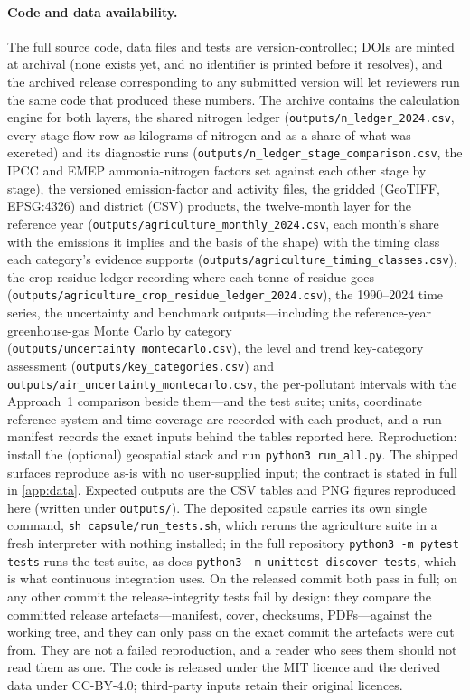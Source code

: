 \paragraph{Code and data availability.} The full source code, data files and tests are
version-controlled; DOIs are minted at archival (none exists yet, and no identifier is
printed before it resolves), and the archived release corresponding to any submitted
version will let reviewers run the same code that produced these numbers. The archive contains the calculation engine for both
layers, the shared nitrogen ledger (\texttt{outputs/n\_ledger\_2024.csv}, every stage-flow
row as kilograms of nitrogen and as a share of what was excreted) and its diagnostic runs
(\texttt{outputs/n\_ledger\_stage\_comparison.csv}, the IPCC and EMEP ammonia-nitrogen
factors set against each other stage by stage), the versioned emission-factor
and activity files, the gridded (GeoTIFF, EPSG:4326) and district (CSV) products, the
twelve-month layer for the reference year
(\texttt{outputs/agriculture\_\allowbreak monthly\_\allowbreak 2024.csv}, each month's share
with the emissions it implies and the basis of the shape) with the timing class each
category's evidence supports (\texttt{outputs/agriculture\_\allowbreak timing\_\allowbreak classes.csv}),
the crop-residue ledger recording where each tonne of residue goes
(\texttt{outputs/agriculture\_\allowbreak crop\_\allowbreak residue\_\allowbreak ledger\_\allowbreak 2024.csv}), the
1990--2024 time series, the uncertainty and benchmark outputs---including the
reference-year greenhouse-gas Monte Carlo by category
(\texttt{outputs/uncertainty\_\allowbreak montecarlo.csv}), the level and trend key-category
assessment (\texttt{outputs/key\_\allowbreak categories.csv}) and
\texttt{outputs/air\_\allowbreak uncertainty\_\allowbreak montecarlo.csv}, the
per-pollutant intervals with the Approach~1 comparison beside them---and the test suite; units,
coordinate reference system and time coverage are recorded with each product, and a run
manifest records the exact inputs behind the tables reported here. Reproduction: install the (optional) geospatial stack and
run \texttt{python3 run\_all.py}. The shipped surfaces reproduce as-is with no
user-supplied input; the contract is stated in full in \ref{app:data}. Expected outputs are the CSV tables and PNG figures
reproduced here (written under \texttt{outputs/}). The deposited capsule carries its own
single command, \texttt{sh capsule/run\_tests.sh}, which reruns the agriculture suite in a
fresh interpreter with nothing installed; in the full repository
\texttt{python3 -m pytest tests} runs the
test suite, as does \texttt{python3 -m unittest discover tests}, which is what continuous
integration uses. On the released commit both pass in full; on any other commit the
release-integrity tests fail by design: they compare the
committed release artefacts---manifest, cover, checksums, PDFs---against the working tree,
and they can only pass on the exact commit the artefacts were cut from. They are not a failed
reproduction, and a reader who sees them should not read them as one. The code is released under the MIT licence and the derived data under
CC-BY-4.0; third-party inputs retain their original licences.

